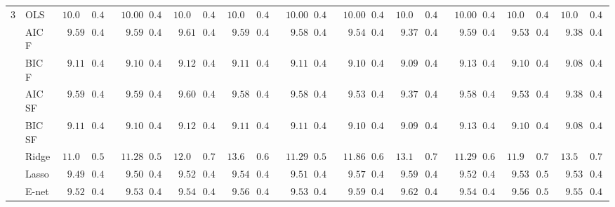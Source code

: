 \begin{tabular}{ll|ll|llllll|llllll|llllll}
3 & OLS  & $10.00$ & $0.45$ & $\phantom{0}10.00$ & $0.45$ & $10.00$ & $0.45$ & $10.00$ & $0.45$ & $\phantom{0}10.00$ & $0.45$ & $\phantom{0}10.00$ & $0.45$ & $10.00$ & $0.45$ & $\phantom{0}10.00$ & $0.45$ & $10.00$ & $0.45$ & $10.00$ & $0.45$ \\
 & AIC F  & $\phantom{0}9.59$ & $0.46$ & $\phantom{00}9.59$ & $0.42$ & $\phantom{0}9.61$ & $0.45$ & $\phantom{0}9.59$ & $0.46$ & $\phantom{00}9.58$ & $0.45$ & $\phantom{00}9.54$ & $0.45$ & $\phantom{0}9.37$ & $0.45$ & $\phantom{00}9.59$ & $0.44$ & $\phantom{0}9.53$ & $0.46$ & $\phantom{0}9.38$ & $0.46$ \\
 & BIC F  & $\phantom{0}9.11$ & $0.41$ & $\phantom{00}9.10$ & $0.42$ & $\phantom{0}9.12$ & $0.41$ & $\phantom{0}9.11$ & $0.41$ & $\phantom{00}9.11$ & $0.41$ & $\phantom{00}9.10$ & $0.41$ & $\phantom{0}9.09$ & $0.41$ & $\phantom{00}9.13$ & $0.41$ & $\phantom{0}9.10$ & $0.41$ & $\phantom{0}9.08$ & $0.41$ \\
 & AIC SF  & $\phantom{0}9.59$ & $0.46$ & $\phantom{00}9.59$ & $0.42$ & $\phantom{0}9.60$ & $0.45$ & $\phantom{0}9.58$ & $0.45$ & $\phantom{00}9.58$ & $0.45$ & $\phantom{00}9.53$ & $0.45$ & $\phantom{0}9.37$ & $0.45$ & $\phantom{00}9.58$ & $0.44$ & $\phantom{0}9.53$ & $0.46$ & $\phantom{0}9.38$ & $0.46$ \\
 & BIC SF  & $\phantom{0}9.11$ & $0.41$ & $\phantom{00}9.10$ & $0.42$ & $\phantom{0}9.12$ & $0.41$ & $\phantom{0}9.11$ & $0.41$ & $\phantom{00}9.11$ & $0.41$ & $\phantom{00}9.10$ & $0.41$ & $\phantom{0}9.09$ & $0.41$ & $\phantom{00}9.13$ & $0.41$ & $\phantom{0}9.10$ & $0.41$ & $\phantom{0}9.08$ & $0.41$ \\
 & Ridge  & $11.07$ & $0.54$ & $\phantom{0}11.28$ & $0.56$ & $12.00$ & $0.71$ & $13.67$ & $0.66$ & $\phantom{0}11.29$ & $0.54$ & $\phantom{0}11.86$ & $0.67$ & $13.13$ & $0.71$ & $\phantom{0}11.29$ & $0.68$ & $11.96$ & $0.71$ & $13.56$ & $0.73$ \\
 & Lasso  & $\phantom{0}9.49$ & $0.45$ & $\phantom{00}9.50$ & $0.46$ & $\phantom{0}9.52$ & $0.48$ & $\phantom{0}9.54$ & $0.42$ & $\phantom{00}9.51$ & $0.44$ & $\phantom{00}9.57$ & $0.45$ & $\phantom{0}9.59$ & $0.44$ & $\phantom{00}9.52$ & $0.48$ & $\phantom{0}9.53$ & $0.50$ & $\phantom{0}9.53$ & $0.44$ \\
 & E-net  & $\phantom{0}9.52$ & $0.46$ & $\phantom{00}9.53$ & $0.46$ & $\phantom{0}9.54$ & $0.49$ & $\phantom{0}9.56$ & $0.42$ & $\phantom{00}9.53$ & $0.45$ & $\phantom{00}9.59$ & $0.46$ & $\phantom{0}9.62$ & $0.44$ & $\phantom{00}9.54$ & $0.49$ & $\phantom{0}9.56$ & $0.50$ & $\phantom{0}9.55$ & $0.44$ \\

\end{tabular}
